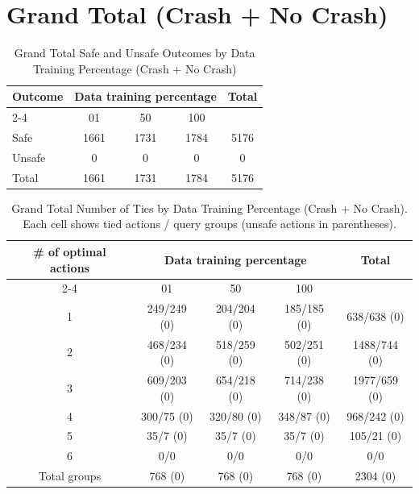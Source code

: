 \documentclass{article}
\begin{document}
\pagebreak
\section{Grand Total (Crash + No Crash)}

\begin{table}[h]
\centering
\caption{Grand Total Safe and Unsafe Outcomes by Data Training Percentage (Crash + No Crash)}
\begin{tabular}{l|ccc|c}
\toprule
\multirow{2}{*}{Outcome} & \multicolumn{3}{c|}{Data training percentage} & \multirow{2}{*}{Total} \\
\cmidrule{2-4}
 & 01 & 50 & 100 & \\
\midrule
Safe & 1661 & 1731 & 1784 & 5176 \\ 
Unsafe & 0 & 0 & 0 & 0 \\ 
\midrule
Total & 1661 & 1731 & 1784 & 5176 \\ 
\bottomrule
\end{tabular}
\end{table}

\begin{table}[h]
\centering
\caption{Grand Total Number of Ties by Data Training Percentage (Crash + No Crash).
Each cell shows tied actions / query groups (unsafe actions in parentheses).}
\begin{tabular}{c|ccc|c}
\toprule
\multirow{2}{*}{\# of optimal actions} & \multicolumn{3}{c|}{Data training percentage} & \multirow{2}{*}{Total} \\
\cmidrule{2-4}
 & 01 & 50 & 100 & \\
\midrule
1 & 249/249 (0) & 204/204 (0) & 185/185 (0) & 638/638 (0) \\ 
2 & 468/234 (0) & 518/259 (0) & 502/251 (0) & 1488/744 (0) \\ 
3 & 609/203 (0) & 654/218 (0) & 714/238 (0) & 1977/659 (0) \\ 
4 & 300/75 (0) & 320/80 (0) & 348/87 (0) & 968/242 (0) \\ 
5 & 35/7 (0) & 35/7 (0) & 35/7 (0) & 105/21 (0) \\ 
6 & 0/0 & 0/0 & 0/0 & 0/0 \\ 
\midrule
Total groups & 768 (0) & 768 (0) & 768 (0) & 2304 (0) \\ 
\bottomrule
\end{tabular}
\end{table}
\end{document}

